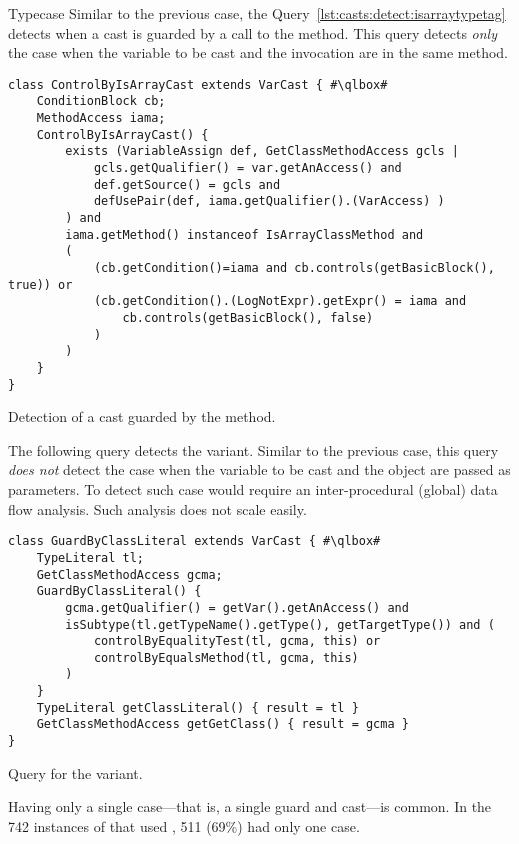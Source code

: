 \begin{pattern}{Typecase}
Similar to the previous case,
the Query~\ref{lst:casts:detect:isarraytypetag} detects when a cast is guarded by a call to the  method.
This query detects \emph{only} the case when the variable to be cast and
the  invocation are in the same method.

\begin{listing}
\begin{verbatim}
class ControlByIsArrayCast extends VarCast { #\qlbox#
	ConditionBlock cb;
	MethodAccess iama;
	ControlByIsArrayCast() {
		exists (VariableAssign def, GetClassMethodAccess gcls |
			gcls.getQualifier() = var.getAnAccess() and
			def.getSource() = gcls and
			defUsePair(def, iama.getQualifier().(VarAccess) )
		) and
		iama.getMethod() instanceof IsArrayClassMethod and
		(
			(cb.getCondition()=iama and cb.controls(getBasicBlock(), true)) or
			(cb.getCondition().(LogNotExpr).getExpr() = iama and
				cb.controls(getBasicBlock(), false)
			)
		)
	}
}
\end{verbatim}
\caption{Detection of a cast guarded by the  method.}
\label{lst:casts:detect:isarraytypetag}
\end{listing}

The following query detects the  variant.
Similar to the previous case,
this query \emph{does not} detect the case when the variable to be cast and the  object are passed as parameters.
To detect such case would require an inter-procedural (global) data flow analysis.
Such analysis does not scale easily.

\begin{listing}
\begin{verbatim}
class GuardByClassLiteral extends VarCast { #\qlbox#
	TypeLiteral tl;
	GetClassMethodAccess gcma;
	GuardByClassLiteral() {
		gcma.getQualifier() = getVar().getAnAccess() and
		isSubtype(tl.getTypeName().getType(), getTargetType()) and (
			controlByEqualityTest(tl, gcma, this) or
			controlByEqualsMethod(tl, gcma, this)
		)
	}
	TypeLiteral getClassLiteral() { result = tl }
	GetClassMethodAccess getGetClass() { result = gcma }
}
\end{verbatim}
\caption{Query for the  variant.}
\end{listing}


\issues{}
Having only a single case---that is, a single guard and cast---is common.
In the 742 instances of \thisp{} that used , 511
(69\%) had only one case.


\end{pattern}
